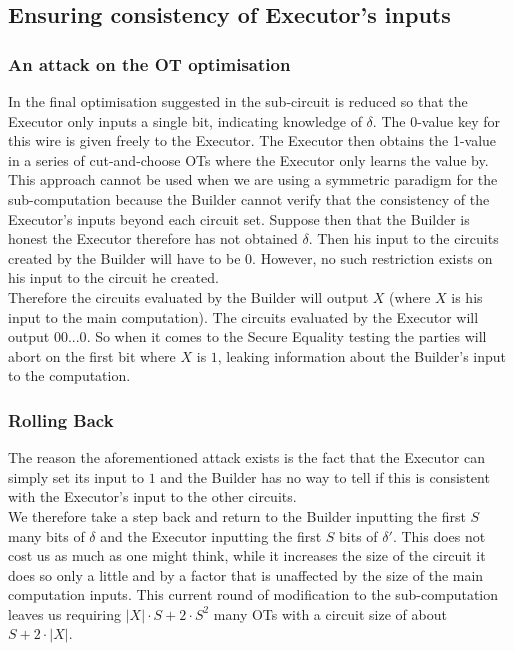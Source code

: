 \documentclass[ %
                    author={Nicholas Tutte},
                supervisor={Prof. Nigel Smart},
                    degree={MEng},
                     title={Secure Two Party Computation},
                  subtitle={A practical comparison of recent protocols},
                      type={Research - GG1K},
                      year={2015} ]{dissertation}
\begin{document}
			\subsection{Ensuring consistency of Executor's inputs}
				\subsubsection{An attack on the OT optimisation}
					In the final optimisation suggested in \cite{Lindell_CnC_2013} the sub-circuit is reduced so that the Executor only inputs a single bit, indicating knowledge of $\delta$. The 0-value key for this wire is given freely to the Executor. The Executor then obtains the 1-value in a series of cut-and-choose OTs where the Executor only learns the value by.\\

					This approach cannot be used when we are using a symmetric paradigm for the sub-computation because the Builder cannot verify that the consistency of the Executor's inputs beyond each circuit set. Suppose then that the Builder is honest the Executor therefore has not obtained $\delta$. Then his input to the circuits created by the Builder will have to be $0$. However, no such restriction exists on his input to the circuit he created.\\

					Therefore the circuits evaluated by the Builder will output $X$ (where $X$ is his input to the main computation). The circuits evaluated by the Executor will output $00...0$. So when it comes to the Secure Equality testing the parties will abort on the first bit where $X$ is $1$, leaking information about the Builder's input to the computation.\\

				\subsubsection{Rolling Back}
					The reason the aforementioned attack exists is the fact that the Executor can simply set its input to $1$ and the Builder has no way to tell if this is consistent with the Executor's input to the other circuits.\\

					We therefore take a step back and return to the Builder inputting the first $S$ many bits of $\delta$ and the Executor inputting the first $S$ bits of $\delta'$. This does not cost us as much as one might think, while it increases the size of the circuit it does so only a little and by a factor that is unaffected by the size of the main computation inputs. This current round of modification to the sub-computation leaves us requiring $|X| \cdot S + 2 \cdot S^2$ many OTs with a circuit size of about $S + 2 \cdot |X|$.
\end{document}

